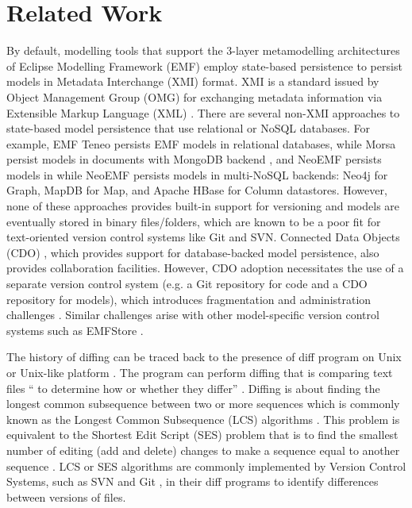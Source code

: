\section{Related Work}
\label{sec:related_work}
By default, modelling tools that support the 3-layer metamodelling architectures of Eclipse Modelling Framework (EMF) \cite{steinberg2008emf} employ state-based persistence to persist models in Metadata Interchange (XMI) format. XMI is a standard issued by Object Management Group (OMG) for exchanging metadata information via Extensible Markup Language (XML) \cite{omg2018xmi}. There are several non-XMI approaches to state-based model persistence that use relational or NoSQL databases. For example, EMF Teneo \cite{eclipse2017teneo} persists EMF models in relational databases, while Morsa \cite{DBLP:conf/models/Espinazo-PaganCM11} persist models in documents with MongoDB backend \cite{mongodb}, and NeoEMF \cite{daniel2016neoemf} persists models in while NeoEMF persists models in multi-NoSQL backends: Neo4j \cite{neo4j2019neo4j} for Graph, MapDB \cite{mapdb2019mapdb} for Map, and Apache HBase \cite{apache2019hbase} for Column datastores. However, none of these approaches provides built-in support for versioning and models are eventually stored in binary files/folders, which are known to be a poor fit for text-oriented version control systems like Git and SVN. Connected Data Objects (CDO) \cite{eclipse2019cdo}, which provides support for database-backed model persistence, also provides collaboration facilities. However, CDO adoption necessitates the use of a separate version control system (e.g. a Git repository for code and a CDO repository for models), which introduces fragmentation and administration challenges \cite{barmpis2014evaluation}. Similar challenges arise with other model-specific version control systems such as EMFStore \cite{koegel2010emfstore}.

The history of diffing can be traced back to the presence of \textsf{diff} program on Unix or Unix-like platform \cite{hunt1976algorithm}. The program can perform diffing that is comparing text files `` to determine how or whether they differ'' \cite{diff}. Diffing is about finding the longest common subsequence between two or more sequences which is commonly known as the Longest Common Subsequence (LCS) algorithms \cite{bergroth2000lcs}. This problem is equivalent to the Shortest Edit Script (SES) problem that is to find the smallest number of editing (add and delete) changes to make a sequence equal to another sequence \cite{DBLP:journals/algorithmica/Meyers86}. LCS or SES algorithms are commonly implemented by Version Control Systems, such as SVN \cite{svn-diff} and Git \cite{git-diff}, in their \textsf{diff} programs to identify differences between versions of files.   

